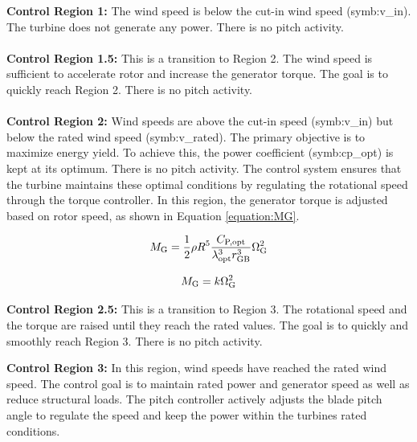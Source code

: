 \textbf{Control Region 1:} The wind speed is below the cut-in wind speed (\gls{symb:v_in}). 
The turbine does not generate any power.
There is no pitch activity.
\\
\\
\textbf{Control Region 1.5:} This is a transition to Region 2.
The wind speed is sufficient to accelerate rotor and increase the generator torque.
The goal is to quickly reach Region 2.
There is no pitch activity.
\\
\\
\textbf{Control Region 2:} Wind speeds are above the cut-in speed (\gls{symb:v_in}) but below the rated wind speed (\gls{symb:v_rated}). 
The primary objective is to maximize energy yield.
To achieve this, the power coefficient (\gls{symb:cp_opt}) is kept at its optimum. 
There is no pitch activity.
The control system ensures that the turbine maintains these optimal conditions by regulating the rotational speed through the torque controller.
In this region, the generator torque is adjusted based on rotor speed, as shown in Equation \ref{equation:MG}.

\begin{equation}
	M_{\textnormal{G}} = \frac{1}{2} \rho R^5 \frac{C_{\textnormal{P,opt}}}{{\lambda_{\textnormal{opt}}^3 r_{\textnormal{GB}}^3}} \Omega_{\textnormal{G}}^2
	\label{equation:MG}
\end{equation}

\begin{equation}
	M_{\textnormal{G}} = k\Omega_{\textnormal{G}}^2
	\label{equation:MG_2}
\end{equation}

\textbf{Control Region 2.5:} This is a transition to Region 3.
The rotational speed and the torque are raised until they reach the rated values. 
The goal is to quickly and smoothly reach Region 3.
There is no pitch activity.

\textbf{Control Region 3:} 
In this region, wind speeds have reached the rated wind speed.
The control goal is to maintain rated power and generator speed as well as reduce structural loads.
The pitch controller actively adjusts the blade pitch angle to regulate the speed and keep the power within the turbines rated conditions.
